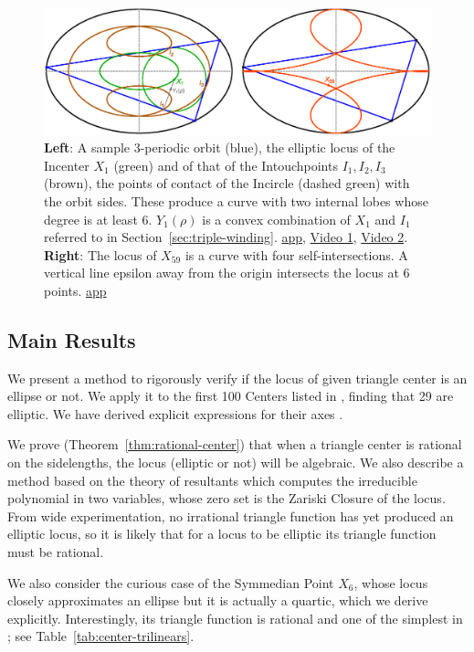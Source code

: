 \begin{figure}
    \centering
    \includegraphics[width=\textwidth]{pics_1021_x1_x59}
    \caption{\textbf{Left}: A sample 3-periodic orbit (blue), the elliptic locus of the Incenter $X_1$ (green) and of that of the Intouchpoints $I_1,I_2,I_3$ (brown), the points of contact of the Incircle (dashed green) with the orbit sides. These produce a curve with two internal lobes whose degree is at least 6. $Y_1(\rho)$ is a convex combination of $X_1$ and $I_1$ referred to in Section~\ref{sec:triple-winding}. \href{https://bit.ly/3q4b0Nn}{app},  \href{https://youtu.be/BBsyM7RnswA}{Video 1}, \href{https://youtu.be/9xU6T7hQMzs}{Video 2}. \textbf{Right}: The locus of $X_{59}$ is a curve with four self-intersections. A vertical line epsilon away from the origin intersects the locus at 6 points. \href{https://bit.ly/3i4h6dX}{app}}
    \label{fig:incenter-loci}
\end{figure}

\subsection*{Main Results}

We present a method to rigorously verify if the locus of given triangle center is an ellipse or not. We apply it to the first 100 Centers listed in \cite{etc}, finding that 29 are elliptic. We have derived explicit expressions for their axes \cite{garcia2021-ellipses-web}.

We prove (Theorem~\ref{thm:rational-center}) that when a triangle center is rational on the sidelengths, the locus (elliptic or not) will be algebraic. We also describe a method based on the theory of resultants which computes the irreducible polynomial in two variables, whose zero set is the Zariski Closure \cite{cox2005-AG} of the locus. From wide experimentation, no irrational triangle function has yet produced an elliptic locus, so it is likely that for a locus to be elliptic its triangle function must be rational.

We also consider the curious case of the Symmedian Point $X_6$, whose locus closely approximates an ellipse but it is actually a quartic, which we derive explicitly. Interestingly, its triangle function is rational and one of the simplest in \cite{etc}; see Table~\ref{tab:center-trilinears}.

